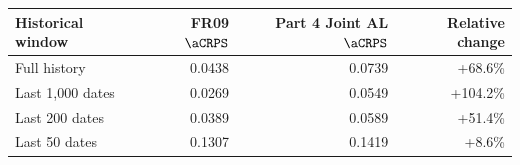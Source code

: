 \begin{tabular}{@{}lrrr@{}}
\toprule
Historical window & FR09 \(\aCRPS\) & Part 4 Joint AL \(\aCRPS\) & Relative change \\
\midrule
Full history & 0.0438 & 0.0739 & +68.6\% \\
Last 1,000 dates & 0.0269 & 0.0549 & +104.2\% \\
Last 200 dates & 0.0389 & 0.0589 & +51.4\% \\
Last 50 dates & 0.1307 & 0.1419 & +8.6\% \\
\bottomrule
\end{tabular}
